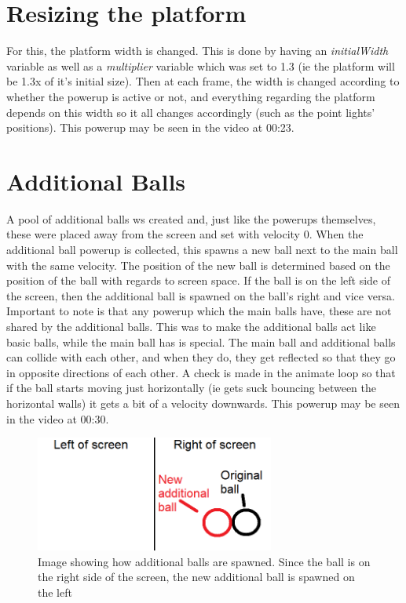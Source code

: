 \section{Resizing the platform}
For this, the platform width is changed. This is done by having an \textit{initialWidth} variable as well as a \textit{multiplier} variable which was set to 1.3 (ie the platform will be 1.3x of it's initial size). Then at each frame, the width is changed according to whether the powerup is active or not, and everything regarding the platform depends on this width so it all changes accordingly (such as the point lights' positions).  This powerup may be seen in the video at 00:23.

\section{Additional Balls}
A pool of additional balls ws created and, just like the powerups themselves, these were placed away from the screen and set with velocity 0. When the additional ball powerup is collected, this spawns a new ball next to the main ball with the same velocity. The position of the new ball is determined based on the position of the ball with regards to screen space. If the ball is on the left side of the screen, then the additional ball is spawned on the ball's right and vice versa. Important to note is that any powerup which the main balls have, these are not shared by the additional balls. This was to make the additional balls act like basic balls, while the main ball has is special. The main ball and additional balls can collide with each other, and when they do, they get reflected so that they go in opposite directions of each other. A check is made in the animate loop so that if the ball starts moving just horizontally (ie gets suck bouncing between the horizontal walls) it gets a bit of a velocity downwards. This powerup may be seen in the video at 00:30.

\begin{figure}[H]
	\centering
	\includegraphics[width=0.7\textwidth]{Images/AdditionalBall.png}
	\caption{Image showing how additional balls are spawned. Since the ball is on the right side of the screen, the new additional ball is spawned on the left}
\end{figure}

